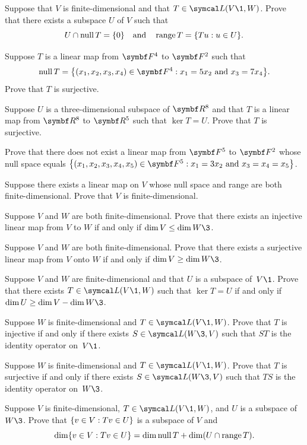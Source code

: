 \begin{exercises}

\exercise
Suppose that $V$ is finite-dimensional and that $T \in \L(V\1,W)$.  Prove that
there exists a subspace $U$ of $V$ such that
\[
U \cap \operatorname{null} T = \{0\} \quad \text{and} \quad \operatorname{range} T = \{Tu:u\in U\}.
\]
\exercisedisplayend


\exercise
Suppose $T$ is a linear map from $\F{4}$ to $\F{2}$ such that
\[
\ker T = \br[\big]{(x_1, x_2, x_3, x_4) \in \F{4}: x_1 = 5 x_2 \mbox{\ and\ } x_3 = 7 x_4 }.
\]
Prove that $T$ is surjective.


\exercise
Suppose $U$ is a three-dimensional subspace of $\R{8}$ and that $T$ is a linear
map from $\R{8}$ to $\R{5}$ such that $\ker  T  = U$.  Prove that $T$
is  surjective.


\exercise
Prove that there does not exist a linear map from $\F{5}$ to $\F{2}$ whose
null space equals
$
\br[\big]{(x_1, x_2, x_3, x_4, x_5) \in \F{5}: x_1 = 3 x_2 \mbox{\ and\ } x_3 = x_4 = x_5}$.


\exercise
Suppose there exists a linear map on $V$ whose null space and range are both
finite-dimensional. Prove that $V$ is finite-dimensional.


\exercise
Suppose $V$ and $W$ are both finite-dimensional.  Prove that there exists
an injective linear map from $V$ to $W$ if and only if \mbox{$\dim V \le \dim W\3$.}


\exercise
Suppose $V$ and $W$ are both finite-dimensional.  Prove that there exists
a surjective linear map from $V$ onto $W$ if and only if \mbox{$\dim V \ge \dim W\3$.}


\exercise
Suppose $V$ and $W$ are finite-dimensional and that
$U$ is a subspace of~$V\1$.
Prove that there exists $T \in \L(V\1,W)$ such that $\ker T = U$
if and only if $\dim U \ge \dim V - \dim W\3$.


\exercise
Suppose $W$ is finite-dimensional and $T \in \L(V\1,W)$.  Prove that $T$ is
injective if and only if there exists $S \in \L(W\3, V)$ such that $ST$ is the identity operator on~$V\1$.


\exercise
Suppose $W$ is finite-dimensional and $T \in \L(V\1,W)$.  Prove that $T$  is
surjective if and only if there exists $S \in \L(W\3, V)$ such that $TS$ is the
identity operator  on~$W\3$.


\exercise
Suppose $V$  is finite-dimensional, $T \in \L(V\1, W)$, and $U$ is a subspace of $W\3$. Prove that $\{v \in V: Tv \in U\}$ is a subspace of $V$ and\label{3diminv}
\[
\dim \{v \in V: Tv \in U\} = \dim \operatorname{null} T + \dim (U \cap \operatorname{range} T).
\]
\exercisedisplayend



\end{exercises}
